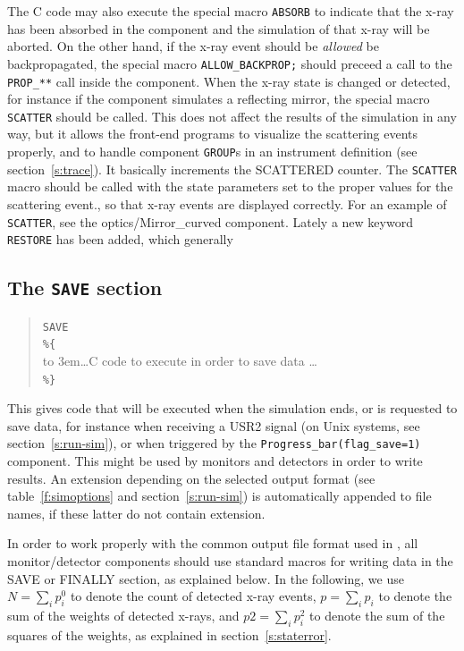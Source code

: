 The C code may also execute the special macro \texttt{ABSORB} to indicate
that the x-ray has been absorbed in the component and the simulation of
that x-ray will be aborted. On the other hand, if the x-ray event
should be \emph{allowed} be backpropagated, the special macro
\verb+ALLOW_BACKPROP;+ should preceed a call to the \verb+PROP_**+
call inside the component.
When the x-ray state is changed or detected, for
instance if the component simulates a reflecting mirror, the
special macro \texttt{SCATTER} should be called. This does not affect the
results of the simulation in any way, but it allows the front-end
programs to visualize the scattering events properly, and to handle
component \texttt{GROUP}s in an instrument definition (see
section~\ref{s:trace}). It basically increments the SCATTERED counter. The \texttt{SCATTER} macro should be called with
the state parameters set to the proper values for the scattering event., so that x-ray events are displayed correctly.
For an example of \texttt{SCATTER}, see the optics/Mirror\_curved
component. 
Lately a new keyword \texttt{RESTORE} has been added, which generally 

\subsection{The \texttt{SAVE} section}
\label{s:comp-save}

\begin{quote}
  \texttt{SAVE} \\
  \verb|%{| \\
  \hbox to 3em{}\ldots C code to execute in order to save data \ldots \\
  \verb|%}|
\end{quote}
This gives code that will be executed when the simulation ends, or is requested to save data, for instance when receiving a USR2 signal (on Unix systems, see section~\ref{s:run-sim}), or when triggered by the \texttt{Progress\_bar(flag\_save=1)} component.
This might be used by monitors and detectors in order to write results.
An extension depending on the selected output format (see table~\ref{f:simoptions} and section~\ref{s:run-sim}) is automatically appended to file names, if these latter do not contain extension.

In order to work properly with the common output file format used in
\MCX, all monitor/detector components should use standard macros for
writing data in the SAVE or FINALLY section, as explained below. In the
following, we use $N = \sum_i p_i^0$ to denote the count of detected
x-ray events, $p = \sum_i p_i$ to denote the sum of the weights of
detected x-rays, and $\textit{p2} = \sum_i p_i^2$ to denote the sum of
the squares of the weights, as explained in section~\ref{s:staterror}.

